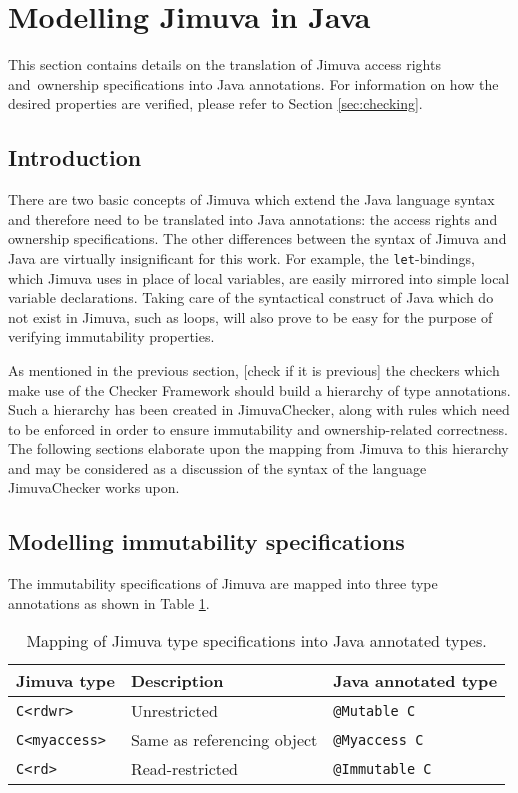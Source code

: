 \documentclass{pracamgr}
\theoremstyle{all}
\newcommand{\todo}[1]{{\color{red} [#1] }}
\begin{document}
\section{Modelling Jimuva in Java}
\label{sec:modelling}

This section contains details on the translation of Jimuva access
rights and~ownership specifications into Java annotations. For
information on how the desired properties are verified, please refer
to Section \ref{sec:checking}.

\subsection{Introduction}

There are two basic concepts of Jimuva which extend the Java language
syntax and therefore need to be translated into Java annotations: the
access rights and ownership specifications. The other differences
between the syntax of Jimuva and Java are virtually insignificant for
this work. For example, the \texttt{let}-bindings, which Jimuva uses
in place of local variables, are easily mirrored into simple local
variable declarations. Taking care of the syntactical construct of
Java which do not exist in Jimuva, such as loops, will also prove to
be easy for the purpose of verifying immutability properties.

As mentioned in the previous section, \todo{check if it is previous}
the checkers which make use of the Checker Framework should build a
hierarchy of type annotations. Such a hierarchy has been created in
JimuvaChecker, along with rules which need to be enforced in order to
ensure immutability and ownership-related correctness. The following
sections elaborate upon the mapping from Jimuva to this hierarchy and
may be considered as a discussion of the syntax of the language
JimuvaChecker works upon.

\subsection{Modelling immutability specifications}

The immutability specifications of Jimuva are mapped into three type
annotations as shown in Table \ref{tab:mapping-immut}. 

\begin{table}[htb]
  \centering
  \begin{tabular}{|l|l|l|}
    \hline
    \textbf{Jimuva type} & \textbf{Description} & \textbf{Java annotated type} \\
    \hline \hline
    \texttt{C<rdwr>} & Unrestricted & \texttt{@Mutable C} \\
    \texttt{C<myaccess>} & Same as referencing object & \texttt{@Myaccess C} \\
    \texttt{C<rd>} & Read-restricted & \texttt{@Immutable C} \\
    \hline
  \end{tabular}
  \caption{Mapping of Jimuva type specifications into Java annotated types.}
  \label{tab:mapping-immut}
\end{table}
\end{document}
